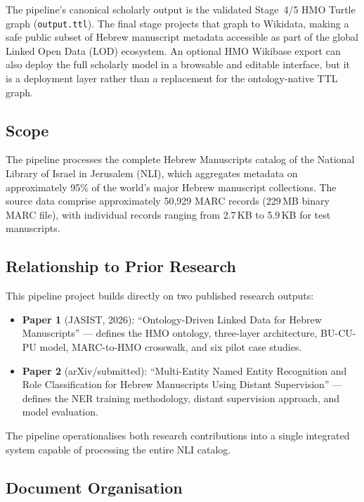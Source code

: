 \documentclass[12pt]{article}
\newcommand{\code}[1]{\texttt{#1}}
\begin{document}
The pipeline's canonical scholarly output is the validated Stage~4/5 HMO Turtle graph (\code{output.ttl}). The final stage projects that graph to Wikidata, making a safe public subset of Hebrew manuscript metadata accessible as part of the global Linked Open Data (LOD) ecosystem. An optional HMO Wikibase export can also deploy the full scholarly model in a browsable and editable interface, but it is a deployment layer rather than a replacement for the ontology-native TTL graph.

\subsection{Scope}

The pipeline processes the complete Hebrew Manuscripts catalog of the National Library of Israel in Jerusalem (NLI), which aggregates metadata on approximately 95\% of the world's major Hebrew manuscript collections. The source data comprise approximately 50,929 MARC records (229\,MB binary MARC file), with individual records ranging from 2.7\,KB to 5.9\,KB for test manuscripts.

\subsection{Relationship to Prior Research}

This pipeline project builds directly on two published research outputs:

\begin{itemize}
\item \textbf{Paper 1} (JASIST, 2026): ``Ontology-Driven Linked Data for Hebrew Manuscripts'' --- defines the HMO ontology, three-layer architecture, BU-CU-PU model, MARC-to-HMO crosswalk, and six pilot case studies.
\item \textbf{Paper 2} (arXiv/submitted): ``Multi-Entity Named Entity Recognition and Role Classification for Hebrew Manuscripts Using Distant Supervision'' --- defines the NER training methodology, distant supervision approach, and model evaluation.
\end{itemize}

The pipeline operationalises both research contributions into a single integrated system capable of processing the entire NLI catalog.

\subsection{Document Organisation}
\end{document}
